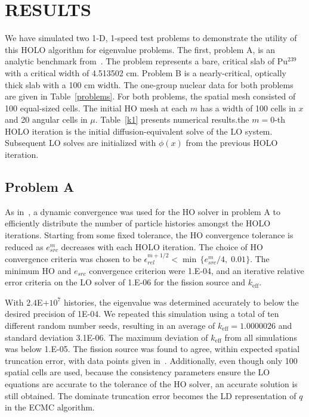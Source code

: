 \documentclass[10pt,twocolumn,pdftex,superscriptaddress]{anstrans}
\newcommand{\keff}{\ensuremath{k_{\text{eff}}}}
\begin{document}
\section*{RESULTS}

\begin{comment}
    To verify the HOLO algorithm, the method of manufactured solutions was applied for
fixed source problems, as in ~\cite{jake}.
\end{comment}

We have simulated two 1-D, 1-speed test problems to demonstrate the utility of
this HOLO algorithm for eigenvalue problems.  The first, problem
A, is an analytic benchmark from~\cite{sood}.  The problem represents a
bare, critical slab of Pu$^{239}$ with a critical width of 4.513502 cm.  Problem B is a nearly-critical, optically thick slab with a 100 cm
width. The one-group
nuclear data for both problems are given in
Table~\ref{problems}.  For both problems, the spatial
mesh consisted of 100 equal-sized
cells.  The initial HO mesh at each $m$ has a width of 100
cells in $x$ and 20 angular cells in $\mu$.     Table~\ref{k1} presents numerical
results.the $m=0$-th HOLO iteration is the initial diffusion-equivalent
solve of the LO system.   Subsequent LO solves are initialized with $\phi(x)$ from the previous
HOLO iteration.   

\subsection*{Problem A}

As in~\cite{willert}, a dynamic convergence was used for the HO solver in problem A to
efficiently distribute the number of particle histories amongst the HOLO iterations.
Starting from some fixed tolerance, the HO convergence tolerance is reduced as
$e_{src}^{m}$ decreases with each HOLO iteration.  The choice of HO convergence
criteria was chosen to be $\epsilon_{rel}^{m+1/2} < \min \,
\{e_{src}^m/4,\; 0.01\} $.  The minimum HO and $e_{src}$ convergence
criterion were 1.E-04, and an iterative relative error criteria on the LO solver of
1.E-06 for the fission source and \keff.  

With $2.4$E$+10^7$ histories, the
eigenvalue was determined accurately to below the desired precision of 1E-04. We repeated this
simulation using a total of ten different random number seeds, resulting in an
average of $\keff = 1.0000026$ and standard deviation 3.1E-06.  The maximum
deviation of $\keff$ from all simulations was below 1.E-05. The fission source was
found to agree, within expected spatial truncation error, with data points given
in~\cite{sood}.
 Additionally, even though only
100 spatial cells are used, because the consistency parameters ensure the LO
equations are accurate to the tolerance of the HO solver, an accurate solution is still obtained.  The dominate
truncation error becomes the LD representation of $q$ in the ECMC algorithm.   
\end{document}

